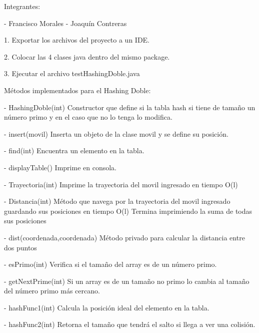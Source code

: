 Integrantes:

- Francisco Morales
- Joaquín Contreras

1. Exportar los archivos del proyecto a un IDE.

2. Colocar las 4 clases java dentro del mismo package.

3. Ejecutar el archivo testHashingDoble.java

Métodos implementados para el Hashing Doble:

- HashingDoble(int)	 Constructor que define si la tabla hash si tiene de tamaño un número primo
                         y en el caso que no lo tenga lo modifica.

- insert(movil) 	      Inserta un objeto de la clase movil y se define su posición.

- find(int) 		Encuentra un elemento en la tabla.

- displayTable()	      Imprime en consola.

- Trayectoria(int)	Imprime la trayectoria del movil ingresado en tiempo O(l)

- Distancia(int)        Método que navega por la trayectoria del movil ingresado guardando sus
                        posiciones en tiempo O(l)
                        Termina imprimiendo la suma de todas sus posiciones

- dist(coordenada,coordenada) Método privado para calcular la distancia entre dos puntos

- esPrimo(int)   	      Verifica si el tamaño del array es de un número primo.

- getNextPrime(int) 	Si un array es de un tamaño no primo lo cambia al tamaño del número primo más cercano.

- hashFunc1(int)	      Calcula la posición ideal del elemento en la tabla.

- hashFunc2(int)	      Retorna el tamaño que tendrá el salto si llega a ver una colisión.